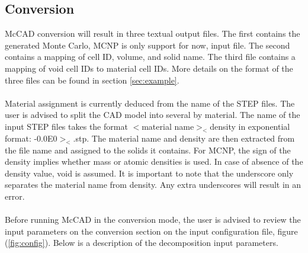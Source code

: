 \documentclass[12pt, a4paper, titlepage]{article}
\begin{document}
  \subsection{Conversion}
    McCAD conversion will result in three textual output files. The first contains the generated Monte Carlo, MCNP is only support for now, input file. The second contains a mapping of cell ID, volume, and solid name. The third file contains a mapping of void cell IDs to material cell IDs. More details on the format of the three files can be found in section \ref{sec:example}. \\
    \\
    Material assignment is currently deduced from the name of the STEP files. The user is advised to split the CAD model into several by material. The name of the input STEP files takes the format $<$material name$>_<$density in exponential format: -0.0E0$>_<$.stp. The material name and density are then extracted from the file name and assigned to the solids it contains. For MCNP, the sign of the density implies whether mass or atomic densities is used. In case of absence of the density value, void is assumed. It is important to note that the underscore only separates the material name from density. Any extra underscores will result in an error. \\
    \\
    Before running McCAD in the conversion mode, the user is advised to review the input parameters on the conversion section on the input configuration file, figure (\ref{fig:config}). Below is a description of the decomposition input parameters.
\end{document}
